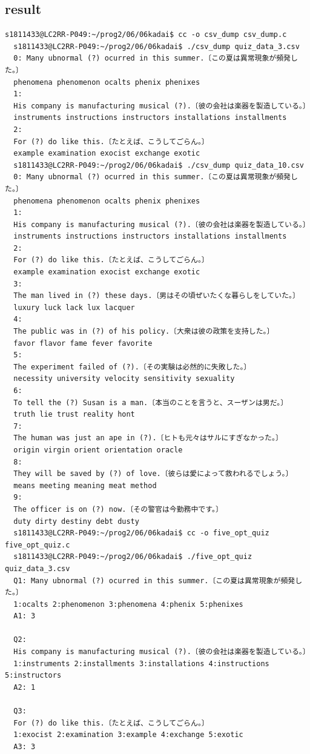 \documentclass[10pt,a4paper]{jsarticle}
\begin{document}
\subsection{result}
\begin{lstlisting}[basicstyle=\ttfamily\footnotesize,frame=single,breaklines=true]
  s1811433@LC2RR-P049:~/prog2/06/06kadai$ cc -o csv_dump csv_dump.c
  s1811433@LC2RR-P049:~/prog2/06/06kadai$ ./csv_dump quiz_data_3.csv
  0: Many ubnormal (?) ocurred in this summer.〔この夏は異常現象が頻発した。〕
  phenomena phenomenon ocalts phenix phenixes
  1:
  His company is manufacturing musical (?).〔彼の会社は楽器を製造している。〕
  instruments instructions instructors installations installments
  2:
  For (?) do like this.〔たとえば、こうしてごらん。〕
  example examination exocist exchange exotic
  s1811433@LC2RR-P049:~/prog2/06/06kadai$ ./csv_dump quiz_data_10.csv
  0: Many ubnormal (?) ocurred in this summer.〔この夏は異常現象が頻発した。〕
  phenomena phenomenon ocalts phenix phenixes
  1:
  His company is manufacturing musical (?).〔彼の会社は楽器を製造している。〕
  instruments instructions instructors installations installments
  2:
  For (?) do like this.〔たとえば、こうしてごらん。〕
  example examination exocist exchange exotic
  3:
  The man lived in (?) these days.〔男はその頃ぜいたくな暮らしをしていた。〕
  luxury luck lack lux lacquer
  4:
  The public was in (?) of his policy.〔大衆は彼の政策を支持した。〕
  favor flavor fame fever favorite
  5:
  The experiment failed of (?).〔その実験は必然的に失敗した。〕
  necessity university velocity sensitivity sexuality
  6:
  To tell the (?) Susan is a man.〔本当のことを言うと、スーザンは男だ。〕
  truth lie trust reality hont
  7:
  The human was just an ape in (?).〔ヒトも元々はサルにすぎなかった。〕
  origin virgin orient orientation oracle
  8:
  They will be saved by (?) of love.〔彼らは愛によって救われるでしょう。〕
  means meeting meaning meat method
  9:
  The officer is on (?) now.〔その警官は今勤務中です。〕
  duty dirty destiny debt dusty
  s1811433@LC2RR-P049:~/prog2/06/06kadai$ cc -o five_opt_quiz five_opt_quiz.c
  s1811433@LC2RR-P049:~/prog2/06/06kadai$ ./five_opt_quiz quiz_data_3.csv
  Q1: Many ubnormal (?) ocurred in this summer.〔この夏は異常現象が頻発した。〕
  1:ocalts 2:phenomenon 3:phenomena 4:phenix 5:phenixes
  A1: 3

  Q2:
  His company is manufacturing musical (?).〔彼の会社は楽器を製造している。〕
  1:instruments 2:installments 3:installations 4:instructions 5:instructors
  A2: 1

  Q3:
  For (?) do like this.〔たとえば、こうしてごらん。〕
  1:exocist 2:examination 3:example 4:exchange 5:exotic
  A3: 3


\end{lstlisting}
\end{document}
